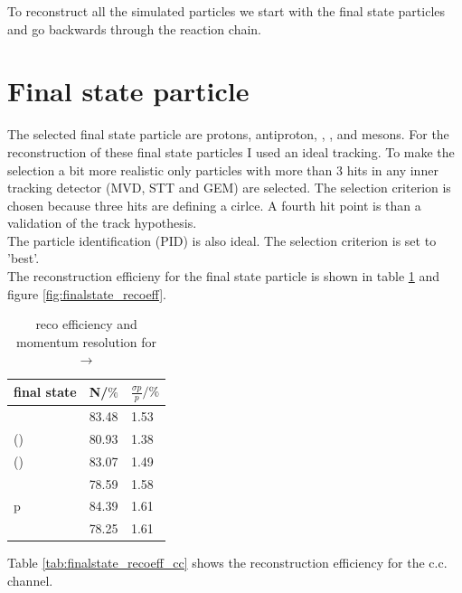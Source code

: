 To reconstruct all the simulated particles we start with the final state particles and go backwards through the reaction chain.

\section{Final state particle}
	The selected final state particle are protons, antiproton, \piminus, \piplus, \kminus and \kplus mesons.
	For the reconstruction of these final state particles I used an ideal tracking. 
	To make the selection a bit more realistic only particles with more than 3 hits in any inner tracking detector (MVD, STT and GEM)
	are selected.
	The selection criterion is chosen because three hits are defining a cirlce.
	A fourth hit point is than a validation of the track hypothesis.\\
	The particle identification (PID) is also ideal. 
	The selection criterion is set to 'best'.\\
	\vspace{11pt} 
	The reconstruction  efficieny for the final state particle is shown in table \ref{tab:finalstate_recoeff} and figure \ref{fig:finalstate_recoeff}.
	
	\begin{table}
		\centering
		\caption{reco efficiency and momentum resolution for \pbarpSystem $\rightarrow$ \excitedcascade \anticascade}
		\label{tab:finalstate_recoeff}
		\begin{tabular}{lll}
			\hline
			final state & N/$\%$ & $\frac{\sigma p}{p}/\%$ \\
			\hline
			\hline
			\piminus & 83.48 & 1.53\\
			\piplusone(\anticascade) &  80.93& 1.38 \\
			\piplustwo(\alam) &  83.07& 1.49\\
			\kminus&  78.59& 1.58\\
			p &  84.39& 1.61\\
			\antiproton & 78.25 & 1.61\\\hline
			 
		\end{tabular}
	\end{table}
	
	Table \ref{tab:finalstate_recoeff_cc} shows the reconstruction efficiency for the c.c. channel.
	
